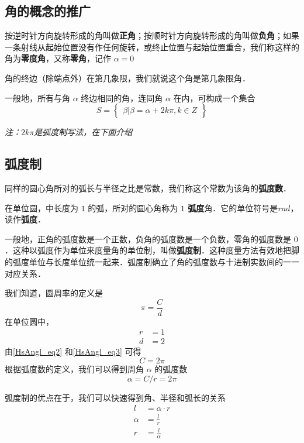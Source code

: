 
\begin{issues}
\issueDraft
\end{issues}

\subsection{角的概念的推广}
按逆时针方向旋转形成的角叫做\textbf{正角}；按顺时针方向旋转形成的角叫做\textbf{负角}；如果一条射线从起始位置没有作任何旋转，或终止位置与起始位置重合，我们称这样的角为\textbf{零度角}，又称\textbf{零角}，记作 $\alpha = 0$

角的终边（除端点外）在第几象限，我们就说这个角是第几象限角．

一般地，所有与角 $\alpha$ 终边相同的角，连同角 $\alpha$ 在内，可构成一个集合
\begin{equation}
S = \begin{Bmatrix} \beta|\beta=\alpha+2k\pi,k \in Z \end{Bmatrix}
\end{equation}

\textsl{注：$2k\pi$是弧度制写法，在下面介绍}

\subsection{弧度制}
同样的圆心角所对的弧长与半径之比是常数，我们称这个常数为该角的\textbf{弧度数}．

在单位圆，中长度为 $1$ 的弧，所对的圆心角称为 \textbf{$1$ 弧度}角．它的单位符号是$rad$，读作\textbf{弧度}．

一般地，正角的弧度数是一个正数，负角的弧度数是一个负数，零角的弧度数是 $0$．这种以弧度作为单位来度量角的单位制，叫做\textbf{弧度制}．这种度量方法有效地把脚的弧度单位与长度单位统一起来．弧度制确立了角的弧度数与十进制实数间的一一对应关系．

我们知道，圆周率的定义是
\begin{equation}\label{HsAngl_eq2}
\pi = \frac{C}{d}
\end{equation}
在单位圆中，
\begin{equation}\label{HsAngl_eq3}
\begin{aligned}
r &= 1\\
d &= 2
\end{aligned}
\end{equation}
由\autoref{HsAngl_eq2} 和\autoref{HsAngl_eq3} 可得
\begin{equation}
C = 2\pi
\end{equation}
根据弧度数的定义，我们可以得到周角 $\alpha$ 的弧度数
\begin{equation}
\alpha = C / r = 2\pi
\end{equation}

弧度制的优点在于，我们可以快速得到角、半径和弧长的关系
\begin{equation}
\begin{aligned}
l &= \alpha \cdot r \\
\alpha &= \frac{l}{r} \\
r &= \frac{l}{\alpha}
\end{aligned}
\end{equation}
